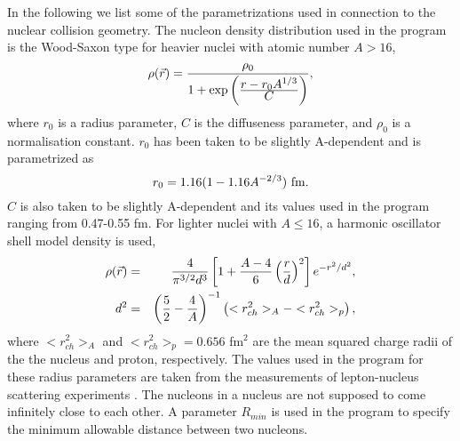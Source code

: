 In the following we list some of the parametrizations used in connection
to the nuclear collision geometry.  
The nucleon density distribution used in the program is the Wood-Saxon type
for heavier nuclei with atomic number $A>16$,
\begin{equation}
\label{ror}
\rho(\vec{r}) =  {{\rho_0}\over {1+\exp\left({{\textstyle r-r_0A^{1/3}}\over \textstyle C}\right)}},
\end{equation}
where $r_0$ is a radius parameter, $C$ is the diffuseness parameter,
and $\rho_0$ is a normalisation constant.
$r_0$ has been taken to be slightly A-dependent and is parametrized as 
\begin{equation}
\label{wsr0}
r_0 = 1.16 \/ (1 - 1.16 A^{-2/3}) {\ \rm fm} .
\end{equation}
$C$ is also taken to be slightly A-dependent and its values used in the
program ranging from 0.47-0.55 fm.  For lighter nuclei with $A\leq 16$,
a harmonic oscillator shell model density is used,
\begin{eqnarray}
\label{rorh}
\rho(\vec{r}) & = & {4\over{\pi^{3/2}d^3}}\left[1+{{A-4}\over 6}
 \left({r\over d}\right)^2\right]
 e^{-r^2/d^2},\nonumber \\
    d^2 & = & \left({5\over 2}-{4\over A}\right)^{-1}
              \left(<r^2_{ch}>_A-<r^2_{ch}>_p\right), 
\end{eqnarray}
where $<r^2_{ch}>_A$ and $<r^2_{ch}>_p=0.656$ fm$^2$ are the mean squared charge radii of the the nucleus and proton, respectively.  The values used in the
program for these radius parameters are taken from the measurements of
lepton-nucleus scattering experiments \cite{size}.  The nucleons
in a nucleus are not supposed to come infinitely close to each other.
A parameter $R_{min}$ is used in the program to specify the minimum allowable 
distance between two nucleons.   

